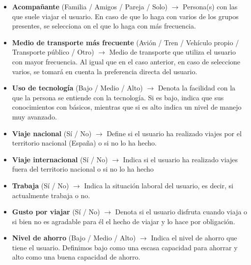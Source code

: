 \begin{itemize}
    \item \textbf{Acompañante} (Familia / Amigos / Pareja / Solo) $\rightarrow$ Persona(s) con las que suele viajar el usuario. En caso de que lo haga con varios de los grupos presentes, se selecciona on el que lo haga con más frecuencia.
    \item \textbf{Medio de transporte más frecuente} (Avión / Tren / Vehículo propio / Transporte público / Otro) $\rightarrow$ Medio de transporte que utiliza el usuario con mayor frecuencia. Al igual que en el caso anterior, en caso de seleccione varios, se tomará en cuenta la preferencia directa del usuario.
    \item \textbf{Uso de tecnología} (Bajo / Medio / Alto) $\rightarrow$ Denota la facilidad con la que la persona se entiende con la tecnología. Si es bajo, indica que sus conocimientos con básicos, mientras que si es alto indica un nivel de manejo muy avanzado.
    \item \textbf{Viaje nacional} (Sí / No) $\rightarrow$ Define si el usuario ha realizado viajes por el territorio nacional (España) o si no lo ha hecho.
    \item \textbf{Viaje internacional} (Sí / No) $\rightarrow$ Indica si el usuario ha realizado viajes fuera del territorio nacional o si no lo ha hecho
    \item \textbf{Trabaja} (Sí / No) $\rightarrow$ Indica la situación laboral del usuario, es decir, si actualmente trabaja o no.
    \item \textbf{Gusto por viajar} (Sí / No) $\rightarrow$ Denota si el usuario disfruta cuando viaja o si bien no es agradable para él el hecho de viajar y lo hace por obligación.
    \item \textbf{Nivel de ahorro} (Bajo / Medio / Alto) $\rightarrow$ Indica el nivel de ahorro que tiene el usuario. Definimos bajo como una escasa capacidad para ahorrar y alto como una buena capacidad de ahorro.
\end{itemize}

